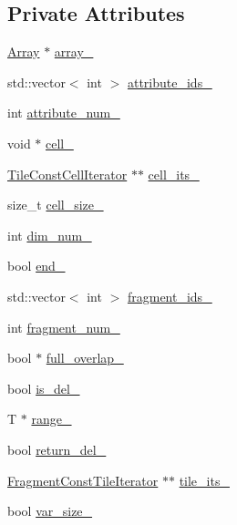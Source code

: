 \subsection*{Private Attributes}
\begin{DoxyCompactItemize}
\item 
\hyperlink{classArray}{Array} $\ast$ \hyperlink{classArrayConstCellIterator_afd29b13b3da8e4f80bd691b7b6eaac39}{array\+\_\+}
\item 
std\+::vector$<$ int $>$ \hyperlink{classArrayConstCellIterator_ade9afc82aabc6c4d1f915bf9c34adf3a}{attribute\+\_\+ids\+\_\+}
\item 
int \hyperlink{classArrayConstCellIterator_a778e82c4aa2d5af0ffa5c56406b5c07b}{attribute\+\_\+num\+\_\+}
\item 
void $\ast$ \hyperlink{classArrayConstCellIterator_a64b7b4292c4f45fca402db418edb0149}{cell\+\_\+}
\item 
\hyperlink{classTileConstCellIterator}{Tile\+Const\+Cell\+Iterator} $\ast$$\ast$ \hyperlink{classArrayConstCellIterator_ad0c94b6c8e3696f0a367ebd808d87651}{cell\+\_\+its\+\_\+}
\item 
size\+\_\+t \hyperlink{classArrayConstCellIterator_a91da6e73446e17b4c1d2b3670b2c4ec8}{cell\+\_\+size\+\_\+}
\item 
int \hyperlink{classArrayConstCellIterator_ac7704577ee8c7a4dd35185576929d69a}{dim\+\_\+num\+\_\+}
\item 
bool \hyperlink{classArrayConstCellIterator_a61b460f93249e972571c4fd3e97b9c4a}{end\+\_\+}
\item 
std\+::vector$<$ int $>$ \hyperlink{classArrayConstCellIterator_a46c2ac214d4878e67c8335202fcd102c}{fragment\+\_\+ids\+\_\+}
\item 
int \hyperlink{classArrayConstCellIterator_a4f3c802c4e8f89df32e405d094608776}{fragment\+\_\+num\+\_\+}
\item 
bool $\ast$ \hyperlink{classArrayConstCellIterator_aa2f4114114b68095a62ce188e846ec3a}{full\+\_\+overlap\+\_\+}
\item 
bool \hyperlink{classArrayConstCellIterator_a79c74d5f2f04aa9bfd1d2106c8ea4fca}{is\+\_\+del\+\_\+}
\item 
T $\ast$ \hyperlink{classArrayConstCellIterator_a56c781c94e0b17ed78d07280e6ea9752}{range\+\_\+}
\item 
bool \hyperlink{classArrayConstCellIterator_ad02a8905ac18e04139f23fec81ef6800}{return\+\_\+del\+\_\+}
\item 
\hyperlink{classFragmentConstTileIterator}{Fragment\+Const\+Tile\+Iterator} $\ast$$\ast$ \hyperlink{classArrayConstCellIterator_a08be1edce3014aacd8691eb1e6c75b35}{tile\+\_\+its\+\_\+}
\item 
bool \hyperlink{classArrayConstCellIterator_a3c926b368ef8096ebb528b4431b73505}{var\+\_\+size\+\_\+}
\end{DoxyCompactItemize}


